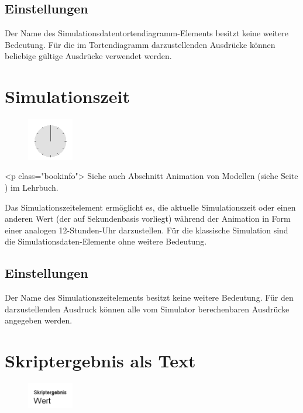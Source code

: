 \subsection*{Einstellungen}

Der Name des Simulationsdatentortendiagramm-Elements besitzt keine weitere Bedeutung. Für die im
Tortendiagramm darzustellenden Ausdrücke können beliebige gültige Ausdrücke verwendet werden.


\section{Simulationszeit}
\label{ref:ModelElementAnimationClock}

\begin{figure}
\vspace{-22pt}
\includegraphics[width=2cm]{imageModelElementAnimationClock.png}
\vspace{-22pt}
\end{figure}

<p class="bookinfo">
Siehe auch Abschnitt Animation von Modellen (siehe Seite \pageref{ref:book:5.4.3}) im Lehrbuch.

Das Simulationszeitelement ermöglicht es, die aktuelle Simulationszeit oder einen anderen Wert
(der auf Sekundenbasis vorliegt) während der Animation in Form einer analogen 12-Stunden-Uhr darzustellen.
Für die klassische Simulation sind die Simulationsdaten-Elemente ohne weitere Bedeutung.

\subsection*{Einstellungen}

Der Name des Simulationszeitelements besitzt keine weitere Bedeutung.
Für den darzustellenden Ausdruck können alle vom Simulator berechenbaren Ausdrücke angegeben werden.


\section{Skriptergebnis als Text}
\label{ref:ModelElementAnimationTextJS}

\begin{figure}
\vspace{-22pt}
\includegraphics[width=2cm]{imageModelElementAnimationTextJS.png}
\vspace{-22pt}
\end{figure}

